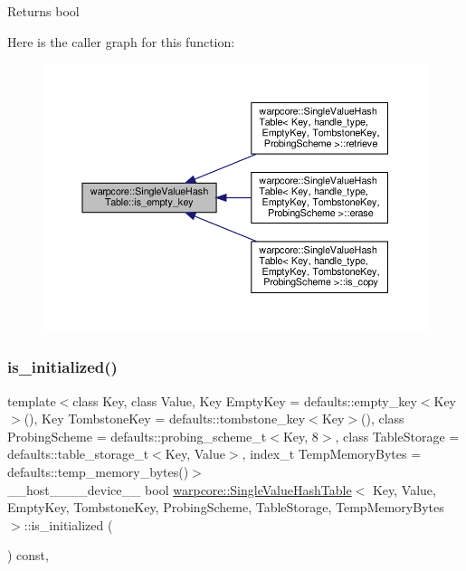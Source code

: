\begin{DoxyReturn}{Returns}
{\ttfamily bool} 
\end{DoxyReturn}
Here is the caller graph for this function\+:
\nopagebreak
\begin{figure}[H]
\begin{center}
\leavevmode
\includegraphics[width=350pt]{classwarpcore_1_1SingleValueHashTable_af74c58b98cbc197243f98940ee0b1baa_icgraph}
\end{center}
\end{figure}
\mbox{\label{classwarpcore_1_1SingleValueHashTable_ae366b3fd0d7edbac68a939fe580df9a4}} 
\subsubsection{\texorpdfstring{is\+\_\+initialized()}{is\_initialized()}}
{\footnotesize\ttfamily template$<$class Key, class Value, Key Empty\+Key = defaults\+::empty\+\_\+key$<$\+Key$>$(), Key Tombstone\+Key = defaults\+::tombstone\+\_\+key$<$\+Key$>$(), class Probing\+Scheme = defaults\+::probing\+\_\+scheme\+\_\+t$<$\+Key, 8$>$, class Table\+Storage = defaults\+::table\+\_\+storage\+\_\+t$<$\+Key, Value$>$, index\+\_\+t Temp\+Memory\+Bytes = defaults\+::temp\+\_\+memory\+\_\+bytes()$>$ \\
\+\_\+\+\_\+host\+\_\+\+\_\+\+\_\+\+\_\+device\+\_\+\+\_\+ bool \hyperlink{classwarpcore_1_1SingleValueHashTable}{warpcore\+::\+Single\+Value\+Hash\+Table}$<$ Key, Value, Empty\+Key, Tombstone\+Key, Probing\+Scheme, Table\+Storage, Temp\+Memory\+Bytes $>$\+::is\+\_\+initialized (\begin{DoxyParamCaption}{ }\end{DoxyParamCaption}) const\hspace{0.3cm}{\ttfamily [inline]}, {\ttfamily [noexcept]}}



